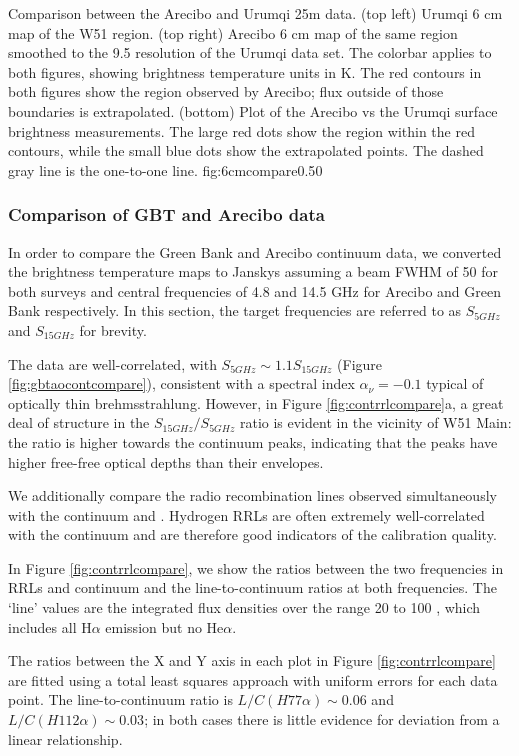 {Comparison between the Arecibo and Urumqi 25m \citep{Sun2011b} data.
(top left) Urumqi 6 cm map of the W51 region.
(top right) Arecibo 6 cm map of the same region smoothed to the 9.5\arcmin
resolution of the Urumqi data set.  The colorbar applies to both figures,
showing brightness temperature units in K.  The red contours in both figures
show the region observed by Arecibo; flux outside of those boundaries is
extrapolated.
(bottom) Plot of the Arecibo vs the Urumqi surface brightness measurements.
The large red dots show the region within the red contours, while the small
blue dots show the extrapolated points.  The dashed gray line is the one-to-one
line.
}
{fig:6cmcompare}{0.5}{0}


\subsubsection{Comparison of GBT and Arecibo data}
In order to compare the Green Bank and Arecibo continuum data, we converted
the brightness temperature maps to Janskys assuming a beam FWHM of 50\arcsec
for both surveys and central frequencies of 4.8 and 14.5 GHz for Arecibo and
Green Bank respectively.  In this section, the target frequencies are referred
to as $S_{5 GHz}$ and $S_{15 GHz}$ for brevity.

The data are well-correlated, with $S_{5 GHz} \sim 1.1 S_{15 GHz}$ (Figure
\ref{fig:gbtaocontcompare}), consistent with a spectral index $\alpha_\nu=-0.1$
typical of optically thin brehmsstrahlung.
However, in Figure \ref{fig:contrrlcompare}a, a great deal of structure in the
$S_{15 GHz}/S_{5 GHz}$ ratio is evident in the vicinity of W51 Main: the ratio
is higher towards the continuum peaks, indicating that the peaks have higher
free-free optical depths than their envelopes.

We additionally compare the radio recombination lines observed simultaneously
with the continuum and \formaldehyde.  Hydrogen RRLs are often extremely
well-correlated with the continuum and are therefore good indicators of the
calibration quality.

In Figure \ref{fig:contrrlcompare}, we show the ratios between the two
frequencies in RRLs and continuum and the line-to-continuum ratios at both
frequencies.  The `line' values are the integrated flux densities over the
range 20 to 100 \kms, which includes all H$\alpha$ emission but no He$\alpha$.

The ratios between the X and Y axis in each plot in Figure
\ref{fig:contrrlcompare} are fitted using a total least squares approach with
uniform errors for each data point.   The line-to-continuum ratio is
$L/C(H77\alpha)\sim0.06$ and $L/C(H112\alpha)\sim0.03$; in both cases there is
little evidence for deviation from a linear relationship.

